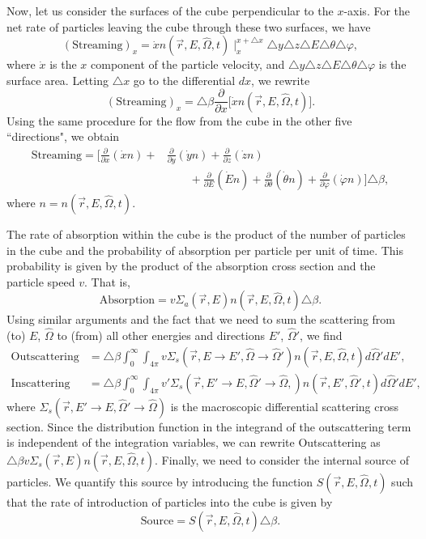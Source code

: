 \documentclass[12pt]{article}
\newcommand{\rvec}{\ensuremath{\vec{r}}}
\newcommand{\omvec}{\ensuremath{\hat{\Omega}}}
\begin{document}
 Now, let us consider the surfaces of the cube perpendicular to the $x$-axis. For the net rate
of particles leaving the cube through these two surfaces, we have
\begin{equation*}
(\textrm{Streaming})_x = \dot x n(\rvec,E,\omvec,t)\mid_x^{x+\triangle x}
\triangle y\triangle z\triangle E\triangle \theta \triangle\varphi,
\end{equation*}
 where $\dot x$ is the $x$ component of the particle velocity,
and 
$\triangle y\triangle z\triangle E\triangle\theta\triangle \varphi$ is the surface area. Letting $\triangle x$ go to
the differential $dx$, we rewrite
\begin{equation*}
(\textrm{Streaming})_x = \triangle \beta \frac{\partial}{\partial x}\big[
\dot x n(\rvec,E,\omvec,t)\big].
\end{equation*}
 Using the same procedure for the flow from the cube in the other five ``directions", we obtain
\begin{align*}
\textrm{Streaming} =
\bigg[ \frac{\partial}{\partial x}(\dot x n) + &
\frac{\partial}{\partial y}(\dot y n) +\frac{\partial}{\partial z}(\dot z n) \\
&\quad\quad + \frac{\partial}{\partial E}(\dot E n) + \frac{\partial}{\partial \theta}(\dot \theta n) +
\frac{\partial}{\partial \varphi}(\dot \varphi n)\bigg] \triangle \beta,
\end{align*}
 where $n = n(\rvec,E,\omvec,t)$.


 The rate of absorption within the cube is the product of the number of particles in the cube
and the probability of absorption per particle per unit of time. This probability is given by
the product of the absorption cross section and the particle speed $v$. That is,
\begin{equation*}
\textrm{Absorption} = v\Sigma_a(\rvec,E)n(\rvec ,E,\omvec,t)\triangle \beta.
\end{equation*}
 Using similar arguments and the fact that we need to sum the scattering from (to) $E$,
$\omvec$ to (from) all other energies and directions $E'$, $\omvec'$, we find
\begin{align*}
\textrm{Outscattering} &= \triangle \beta \int_0^{\infty}\int_{4\pi}
v\Sigma_s(\rvec,E\rightarrow E', \omvec\rightarrow\omvec')n(\rvec,E,\omvec,t)d\omvec'dE', \\
\textrm{Inscattering} &= \triangle \beta \int_0^{\infty}\int_{4\pi}
v'\Sigma_s(\rvec,E'\rightarrow E, \omvec'\rightarrow\omvec,)n(\rvec,E',\omvec',t)d\omvec'dE',
\end{align*}
 where $\Sigma_s(\rvec,E'\rightarrow E, \omvec'\rightarrow\omvec)$ is the macroscopic differential scattering cross section. Since the distribution function in the integrand of the outscattering term is independent of
 the integration variables, we can rewrite
Outscattering as $\triangle \beta v\Sigma_s(\rvec,E)n(\rvec, E, \omvec,t).$
Finally, we need to consider the internal source of particles. We
quantify this source  by introducing the function $S(\rvec, E, \omvec, t)$
such that the rate of introduction of particles into the cube is given by
\begin{equation*}
\textrm{Source} = S(\rvec,E,\omvec,t)\triangle \beta.
\end{equation*}
\end{document}
